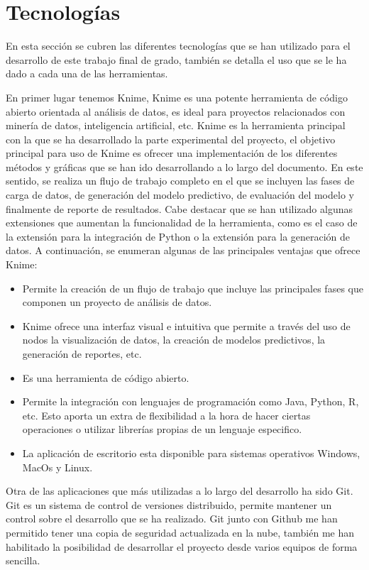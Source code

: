 \section{Tecnologías}

En esta sección se cubren las diferentes tecnologías que se han utilizado para el desarrollo de este trabajo final de grado, también se detalla el uso que se  le ha dado a cada una de las herramientas. 

\bigbreak

En primer lugar tenemos Knime, Knime es una potente herramienta de código abierto orientada al análisis de datos, es ideal para proyectos relacionados con minería de datos, inteligencia artificial, etc. Knime es la herramienta principal con la que se ha desarrollado la parte experimental del proyecto, el objetivo principal para uso de Knime es ofrecer una implementación de los diferentes métodos y gráficas que se han ido desarrollando a lo largo del documento. En este sentido, se realiza un flujo de trabajo completo en el que se incluyen las fases de carga de datos, de generación del modelo predictivo, de evaluación del modelo y finalmente de reporte de resultados. Cabe destacar que se han utilizado algunas extensiones que aumentan la funcionalidad de la herramienta, como es el caso de la extensión para la integración de Python o la extensión para la generación de datos. A continuación, se enumeran algunas de las principales ventajas que ofrece Knime:

\begin{itemize}
    \item Permite la creación de un flujo de trabajo que incluye las principales fases que componen un proyecto de análisis de datos. 
    \item Knime ofrece una interfaz visual e intuitiva que permite a través del uso de nodos la visualización de datos, la creación de modelos predictivos, la generación de reportes, etc.
    \item Es una herramienta de código abierto.
    \item Permite la integración con lenguajes de programación como Java, Python, R, etc. Esto aporta un extra de flexibilidad a la hora de hacer ciertas operaciones o utilizar librerías propias de un lenguaje especifico.
    \item La aplicación de escritorio esta disponible para sistemas operativos Windows, MacOs y Linux.
\end{itemize}

\bigbreak

Otra de las aplicaciones que más utilizadas a lo largo del desarrollo ha sido Git. Git es un sistema de control de versiones distribuido, permite mantener un control sobre el desarrollo que se ha realizado. Git junto con Github me han permitido tener una copia de seguridad actualizada en la nube, también me han habilitado la posibilidad de desarrollar el proyecto desde varios equipos de forma sencilla.

\clearpage